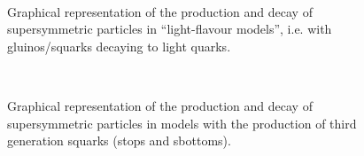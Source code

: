 \begin{figure}[h!]
  \begin{center}
     ~~
    \caption{
      Graphical representation of the production and decay of supersymmetric particles 
      in ``light-flavour models'', i.e. with gluinos/squarks decaying to light quarks. 
    }
    \label{fig:simplified-models-feyn-light}
  \end{center}
\end{figure}


\begin{figure}[h!]
  \begin{center}
     ~~
    \caption{
      Graphical representation of the production and decay of supersymmetric particles 
      in models with the production of third generation squarks (stops and sbottoms). 
    }
    \label{fig:simplified-models-feyn-3rdGen}
  \end{center}
\end{figure}




